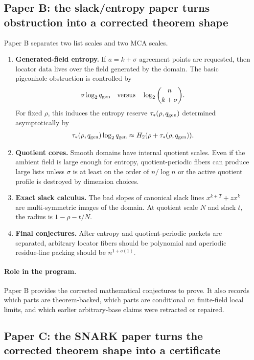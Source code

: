 \documentclass[11pt]{article}
\theoremstyle{definition}
\theoremstyle{remark}
\newcommand{\qgen}{q_{\rm gen}}
\newcommand{\Hbin}{H_2}
\newcommand{\taustar}{\tau_*}
\newcommand{\paperB}{Paper B}
\newcommand{\paperC}{Paper C}
\begin{document}
\subsection{\paperB: the slack/entropy paper turns obstruction into a corrected theorem shape}

\paperB{} separates two list scales and two MCA scales.
\begin{enumerate}[leftmargin=2.2em]
\item \textbf{Generated-field entropy.}  If $a=k+\sigma$ agreement points are requested, then locator data lives over the field generated by the domain.  The basic pigeonhole obstruction is controlled by
\[
        \sigma\log_2 \qgen \quad\text{versus}\quad \log_2\binom n{k+\sigma}.
\]
For fixed $\rho$, this induces the entropy reserve $\taustar(\rho,\qgen)$ determined asymptotically by
\[
        \taustar(\rho,\qgen)\log_2\qgen \approx \Hbin(\rho+\taustar(\rho,\qgen)).
\]
\item \textbf{Quotient cores.}  Smooth domains have internal quotient scales.  Even if the ambient field is large enough for entropy, quotient-periodic fibers can produce large lists unless $\sigma$ is at least on the order of $n/\log n$ or the active quotient profile is destroyed by dimension choices.
\item \textbf{Exact slack calculus.}  The bad slopes of canonical slack lines $x^{k+T}+z x^k$ are multi-symmetric images of the domain.  At quotient scale $N$ and slack $t$, the radius is $1-\rho-t/N$.
\item \textbf{Final conjectures.}  After entropy and quotient-periodic packets are separated, arbitrary locator fibers should be polynomial and aperiodic residue-line packing should be $n^{1+o(1)}$.
\end{enumerate}

\paragraph{Role in the program.}  \paperB{} provides the corrected mathematical conjectures to prove.  It also records which parts are theorem-backed, which parts are conditional on finite-field local limits, and which earlier arbitrary-base claims were retracted or repaired.

\subsection{\paperC: the SNARK paper turns the corrected theorem shape into a certificate}
\end{document}
